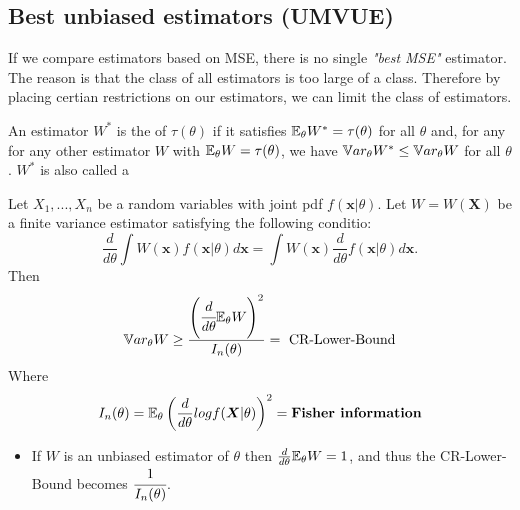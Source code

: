 \subsection{Best unbiased estimators (UMVUE)}
If we compare estimators based on MSE, there is no single \textit{"best MSE"} estimator. The reason is that the class of all estimators is too large of a class. Therefore by placing certian restrictions on our estimators, we can limit the class of estimators.  
\begin{definition}
    An estimator $W^*$ is the  of $\tau(\theta)$ if it satisfies $\mathbb E_{\theta}W^* = \tau(\theta)$ for all $\theta$ and, for any for any other estimator $W$ with $\mathbb E_{\theta}W = \tau(\theta)$, we have $\mathbb V ar_{\theta}W^* \leq \mathbb V ar_{\theta} W$ for all $\theta$. $W^*$ is also called a 
\end{definition}
\begin{theorem}
    Let $X_1,...,X_n$ be a random variables with joint pdf $f(\boldsymbol{x}|\theta)$. Let $W = W(\boldsymbol{X})$ be a finite variance estimator satisfying the following conditio:
    $$
    \frac{d}{d\theta} \int W(\boldsymbol{x})f(\boldsymbol{x}|\theta)d\boldsymbol{x} = 
    \int W(\boldsymbol{x}) \frac{d}{d \theta}f(\boldsymbol{x}|\theta)d \boldsymbol{x}.
    $$
    Then 
    $$
    \mathbb V ar_{\theta}W \geq \frac{\left( \cfrac{d}{d\theta} \mathbb E_\theta W \right)^2}{I_n(\theta)}
    = \text{ CR-Lower-Bound}
    $$
    Where
    $$
    I_n(\theta) = \mathbb E_{\theta}\left (
    \frac{d}{d \theta} log f(\boldsymbol{X}|\theta)
    \right)^2 = \textbf{Fisher information}
    $$
\end{theorem}
\begin{itemize}
    \item If $W$ is an unbiased estimator of $\theta$ then $\frac{d}{d \theta} \mathbb E_{\theta}W =1$, and thus the CR-Lower-Bound becomes $\cfrac{1}{I_n(\theta)}$.
\end{itemize}
